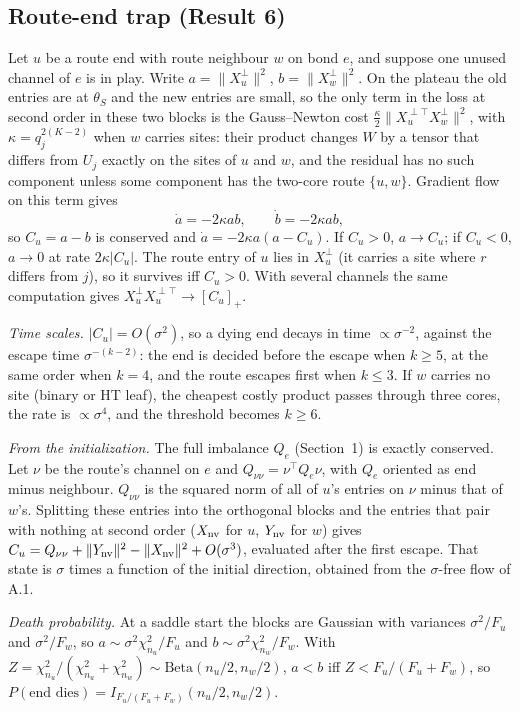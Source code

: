\documentclass[11pt]{article}
\begin{document}
\subsection{Route-end trap (Result 6)}\label{app:trap}
Let $u$ be a route end with route neighbour $w$ on bond $e$, and suppose one unused channel of $e$ is in play.
Write $a=\lVert X_u^\perp\rVert^2$, $b=\lVert X_w^\perp\rVert^2$. On the plateau the old entries are at
$\theta_S$ and the new entries are small, so the only term in the loss at second order in these two blocks is
the Gauss--Newton cost $\tfrac\kappa2\lVert X_u^{\perp\top}X_w^\perp\rVert^2$, with $\kappa=q_j^{2(K-2)}$ when $w$
carries sites: their product changes $W$ by a tensor that differs from $U_j$ exactly on the sites of $u$ and
$w$, and the residual has no such component unless some component has the two-core route $\{u,w\}$. Gradient flow on this term gives
\[
\dot a=-2\kappa ab,\qquad \dot b=-2\kappa ab,
\]
so $C_u=a-b$ is conserved and $\dot a=-2\kappa a(a-C_u)$. If $C_u>0$, $a\to C_u$; if $C_u<0$, $a\to0$ at rate
$2\kappa\lvert C_u\rvert$. The route entry of $u$ lies in $X_u^\perp$ (it carries a site where $r$ differs from
$j$), so it survives iff $C_u>0$. With several channels the same computation gives
$X_u^\perp X_u^{\perp\top}\to[C_u]_+$.

\emph{Time scales.} $\lvert C_u\rvert=O(\sigma^2)$, so a dying end decays in time $\propto\sigma^{-2}$, against the
escape time $\sigma^{-(k-2)}$: the end is decided before the escape when $k\ge5$, at the same order when $k=4$,
and the route escapes first when $k\le3$. If $w$ carries no site (binary or HT leaf), the cheapest costly product
passes through three cores, the rate is $\propto\sigma^4$, and the threshold becomes $k\ge6$.

\emph{From the initialization.} The full imbalance $Q_e$ (Section~1) is exactly conserved.
Let $\nu$ be the route's channel on $e$ and $Q_{\nu\nu}=\nu^\top Q_e\nu$, with $Q_e$ oriented as end minus
neighbour. $Q_{\nu\nu}$ is the squared norm of all of $u$'s entries on $\nu$ minus that of $w$'s. Splitting these
entries into the orthogonal blocks and the entries that pair with nothing at second order ($X_{\rm nv}$ for
$u$, $Y_{\rm nv}$ for $w$) gives
$C_u=Q_{\nu\nu}+\lVert Y_{\rm nv}\rVert^2-\lVert X_{\rm nv}\rVert^2+O(\sigma^3)$, evaluated after the first escape. That
state is $\sigma$ times a function of the initial direction, obtained from the $\sigma$-free flow of A.1.

\emph{Death probability.} At a saddle start the blocks are Gaussian with variances $\sigma^2/F_u$ and
$\sigma^2/F_w$, so $a\sim\sigma^2\chi^2_{n_u}/F_u$ and $b\sim\sigma^2\chi^2_{n_w}/F_w$. With
$Z=\chi^2_{n_u}/(\chi^2_{n_u}+\chi^2_{n_w})\sim\mathrm{Beta}(n_u/2,n_w/2)$, $a<b$ iff $Z<F_u/(F_u+F_w)$, so
$P(\text{end dies})=I_{F_u/(F_u+F_w)}(n_u/2,n_w/2)$.
\end{document}
